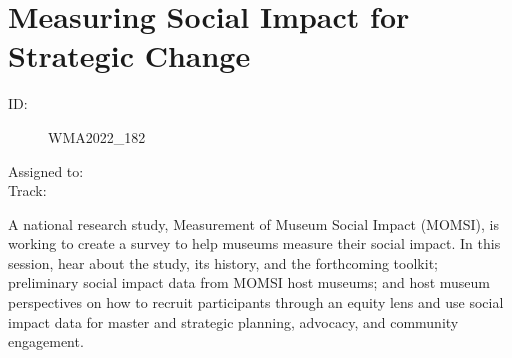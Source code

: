 \documentclass{report}
\begin{document}
              
        
          \newpage
          \section{ Measuring Social Impact for Strategic Change }
            \begin{description}
              \item [ID:]
              WMA2022\_182

              \item [Assigned to:]
                \item [Track:]
              \end{description}

              A national research study, Measurement of Museum Social Impact (MOMSI), is working to create a survey to help museums measure their social impact. In this session, hear about the study, its history, and the forthcoming toolkit; preliminary social impact data from MOMSI host museums; and host museum perspectives on how to recruit participants through an equity lens and use social impact data for master and strategic planning, advocacy, and community engagement.
\end{document}
